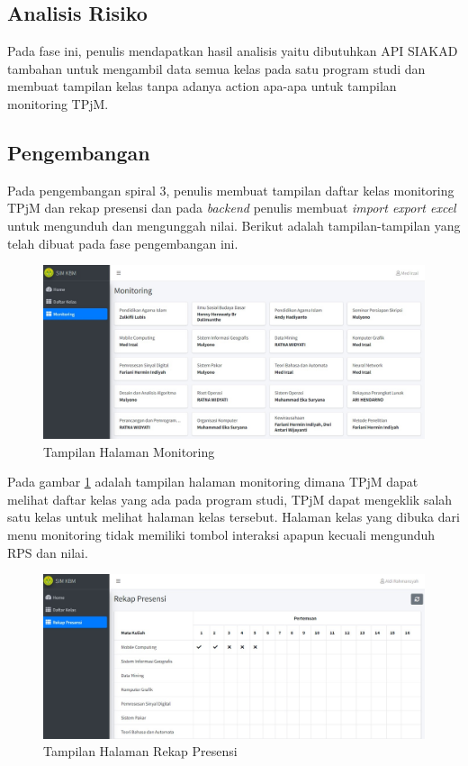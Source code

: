 \subsection{Analisis Risiko}
	Pada fase ini, penulis mendapatkan hasil analisis yaitu dibutuhkan API SIAKAD tambahan untuk mengambil data semua kelas pada satu program studi dan membuat tampilan kelas tanpa adanya action apa-apa untuk tampilan monitoring TPjM.
\subsection{Pengembangan}
	Pada pengembangan spiral 3, penulis membuat tampilan daftar kelas monitoring TPjM dan rekap presensi dan pada \textit{backend} penulis membuat \textit{import export excel} untuk mengunduh dan mengunggah nilai. Berikut adalah tampilan-tampilan yang telah dibuat pada fase pengembangan ini.

\begin{figure}[h!]
	\centering
	\includegraphics[width=1\textwidth]{gambar/ss/monitoring}
	\caption{Tampilan Halaman Monitoring}
	\label{fig:ssmonitoring}
\end{figure}

Pada gambar \ref{fig:ssmonitoring} adalah tampilan halaman monitoring dimana TPjM dapat melihat daftar kelas yang ada pada program studi, TPjM dapat mengeklik salah satu kelas untuk melihat halaman kelas tersebut. Halaman kelas yang dibuka dari menu monitoring tidak memiliki tombol interaksi apapun kecuali mengunduh RPS dan nilai.

\begin{figure}[h!]
	\centering
	\includegraphics[width=1\textwidth]{gambar/ss/rekap_presensi}
	\caption{Tampilan Halaman Rekap Presensi}
	\label{fig:ssrekappresensi}
\end{figure}

